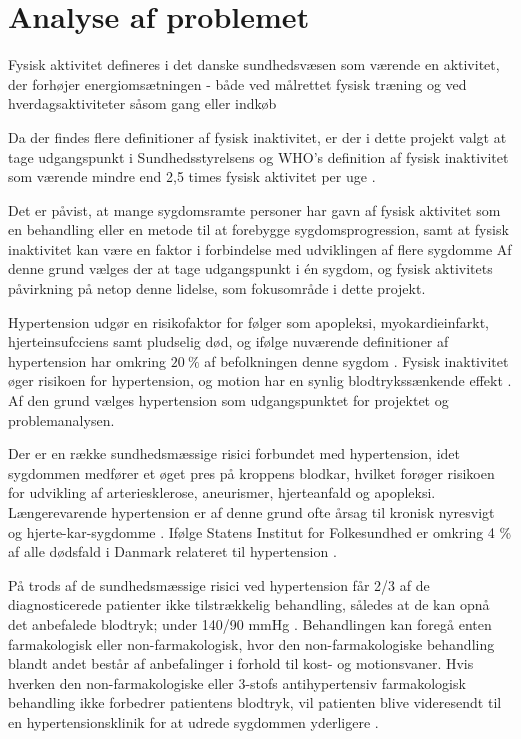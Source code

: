 \section{Analyse af problemet}
Fysisk aktivitet defineres i det danske sundhedsvæsen som værende en aktivitet, der forhøjer energiomsætningen - både ved målrettet fysisk træning og ved hverdagsaktiviteter såsom gang eller indkøb \citep{motionsraad2007, terkelsen2015}

Da der findes flere definitioner af fysisk inaktivitet, er der i dette projekt valgt at tage udgangspunkt i Sundhedsstyrelsens og WHO's definition af fysisk inaktivitet som værende mindre end 2,5 times fysisk aktivitet per uge \citep{motionsraad2007}. 

Det er påvist, at mange sygdomsramte personer har gavn af fysisk aktivitet som en behandling eller en metode til at forebygge sygdomsprogression, samt at fysisk inaktivitet kan være en faktor i forbindelse med udviklingen af flere sygdomme \citep{motionsraad2007,pedersen2011}
Af denne grund vælges der at tage udgangspunkt i én sygdom, og fysisk aktivitets påvirkning på netop denne lidelse, som fokusområde i dette projekt.

Hypertension udgør en risikofaktor for følger som apopleksi, myokardieinfarkt, hjerteinsufcciens samt pludselig død, og ifølge nuværende definitioner af hypertension har omkring $20~\%$ af befolkningen denne sygdom \citep{pedersen2011}. Fysisk inaktivitet øger risikoen for hypertension, og motion har en synlig blodtrykssænkende effekt \citep{olsen2015}. Af den grund vælges hypertension som udgangspunktet for projektet og problemanalysen. 

Der er en række sundhedsmæssige risici forbundet med hypertension, idet sygdommen medfører et øget pres på kroppens blodkar, hvilket forøger risikoen for udvikling af arteriesklerose, aneurismer, hjerteanfald og apopleksi. Længerevarende hypertension er af denne grund ofte årsag til kronisk nyresvigt og hjerte-kar-sygdomme \citep{martini2015}. Ifølge Statens Institut for Folkesundhed er omkring 4 \% af alle dødsfald i Danmark relateret til hypertension \citep{juel2006}.

På trods af de sundhedsmæssige risici ved hypertension får 2/3 af de diagnosticerede patienter ikke tilstrækkelig behandling, således at de kan opnå det anbefalede blodtryk; under 140/90 mmHg \citep{martini2015, paulsen2012}. Behandlingen kan foregå enten farmakologisk eller non-farmakologisk, hvor den non-farmakologiske behandling blandt andet består af anbefalinger i forhold til kost- og motionsvaner. Hvis hverken den non-farmakologiske eller 3-stofs antihypertensiv farmakologisk behandling ikke forbedrer patientens blodtryk, vil patienten blive videresendt til en hypertensionsklinik for at udrede sygdommen yderligere \cite{lodberg2016, bech2015}.

